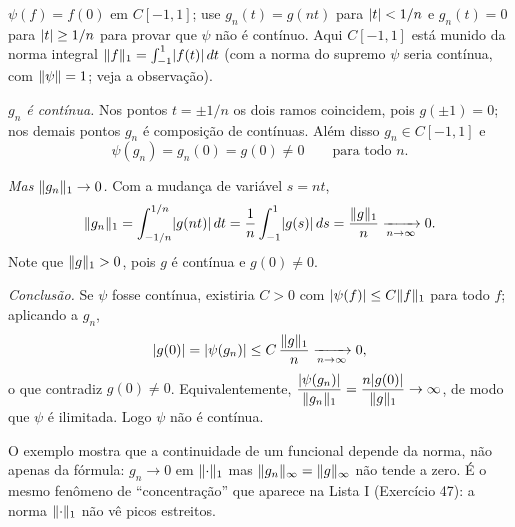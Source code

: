 \begin{exercicio}{$\psi(f)=f(0)$ em $C[-1,1]$; use $g_n(t)=g(nt)$ para $\lvert t\rvert<1/n$ e $g_n(t)=0$ para $\lvert t\rvert\ge1/n$ para provar que $\psi$ não é contínuo.}
\sol
Aqui $C[-1,1]$ está munido da norma integral $\lVert f\rVert_1=\int_{-1}^{1}\lvert f(t)\rvert\,dt$ (com a norma do supremo $\psi$ seria contínua, com $\lVert\psi\rVert=1$; veja a observação).

\emph{$g_n$ é contínua.} Nos pontos $t=\pm1/n$ os dois ramos coincidem, pois $g(\pm1)=0$; nos demais pontos $g_n$ é composição de contínuas. Além disso $g_n\in C[-1,1]$ e
\[ \psi(g_n)=g_n(0)=g(0)\neq0 \qquad\text{para todo } n. \]

\emph{Mas $\lVert g_n\rVert_1\to0$.} Com a mudança de variável $s=nt$,
\[ \lVert g_n\rVert_1=\int_{-1/n}^{1/n}\lvert g(nt)\rvert\,dt=\frac1n\int_{-1}^{1}\lvert g(s)\rvert\,ds=\frac{\lVert g\rVert_1}{n}\xrightarrow[n\to\infty]{}0. \]
Note que $\lVert g\rVert_1>0$, pois $g$ é contínua e $g(0)\neq0$.

\emph{Conclusão.} Se $\psi$ fosse contínua, existiria $C>0$ com $\lvert\psi(f)\rvert\le C\lVert f\rVert_1$ para todo $f$; aplicando a $g_n$,
\[ \lvert g(0)\rvert=\lvert\psi(g_n)\rvert\le C\,\frac{\lVert g\rVert_1}{n}\xrightarrow[n\to\infty]{}0, \]
o que contradiz $g(0)\neq0$. Equivalentemente, $\dfrac{\lvert\psi(g_n)\rvert}{\lVert g_n\rVert_1}=\dfrac{n\lvert g(0)\rvert}{\lVert g\rVert_1}\to\infty$, de modo que $\psi$ é ilimitada. Logo $\psi$ não é contínua.

\begin{obs}
O exemplo mostra que a continuidade de um funcional depende da norma, não apenas da fórmula: $g_n\to0$ em $\lVert\cdot\rVert_1$ mas $\lVert g_n\rVert_\infty=\lVert g\rVert_\infty$ não tende a zero. É o mesmo fenômeno de ``concentração'' que aparece na Lista I (Exercício 47): a norma $\lVert\cdot\rVert_1$ não vê picos estreitos.
\end{obs}
\end{exercicio}

